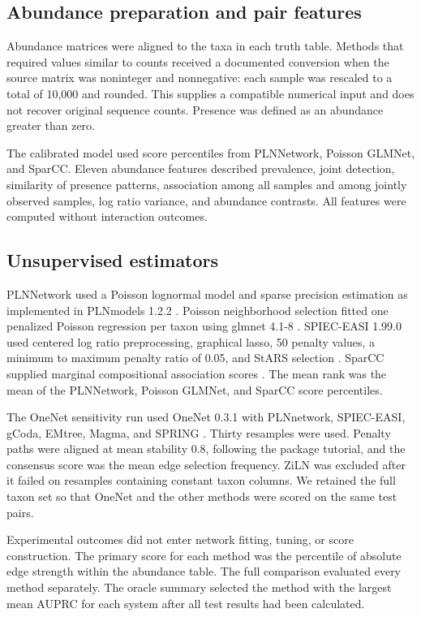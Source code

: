 \documentclass[11pt]{article}
\begin{document}
\subsection{Abundance preparation and pair features}

Abundance matrices were aligned to the taxa in each truth table.
Methods that required values similar to counts received a documented conversion when the source matrix was noninteger and nonnegative: each sample was rescaled to a total of 10,000 and rounded.
This supplies a compatible numerical input and does not recover original sequence counts.
Presence was defined as an abundance greater than zero.

The calibrated model used score percentiles from PLNNetwork, Poisson GLMNet, and SparCC.
Eleven abundance features described prevalence, joint detection, similarity of presence patterns, association among all samples and among jointly observed samples, log ratio variance, and abundance contrasts.
All features were computed without interaction outcomes.

\subsection{Unsupervised estimators}

PLNNetwork used a Poisson lognormal model and sparse precision estimation as implemented in PLNmodels 1.2.2 \citep{chiquet2019pln}.
Poisson neighborhood selection fitted one penalized Poisson regression per taxon using glmnet 4.1-8 \citep{allen2013poisson,friedman2010glmnet}.
SPIEC-EASI 1.99.0 used centered log ratio preprocessing, graphical lasso, 50 penalty values, a minimum to maximum penalty ratio of 0.05, and StARS selection \citep{kurtz2015spieceasi}.
SparCC supplied marginal compositional association scores \citep{friedman2012sparcc}.
The mean rank was the mean of the PLNNetwork, Poisson GLMNet, and SparCC score percentiles.

The OneNet sensitivity run used OneNet 0.3.1 with PLNnetwork, SPIEC-EASI, gCoda, EMtree, Magma, and SPRING \citep{champion2024onenet}.
Thirty resamples were used.
Penalty paths were aligned at mean stability 0.8, following the package tutorial, and the consensus score was the mean edge selection frequency.
ZiLN was excluded after it failed on resamples containing constant taxon columns.
We retained the full taxon set so that OneNet and the other methods were scored on the same test pairs.

Experimental outcomes did not enter network fitting, tuning, or score construction.
The primary score for each method was the percentile of absolute edge strength within the abundance table.
The full comparison evaluated every method separately.
The oracle summary selected the method with the largest mean AUPRC for each system after all test results had been calculated.
\end{document}
